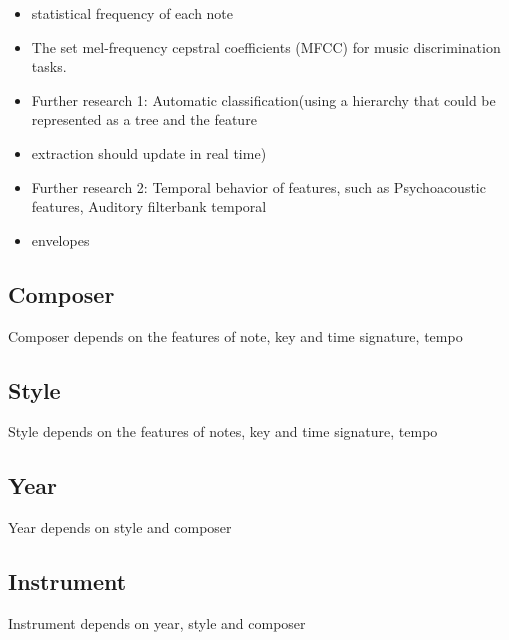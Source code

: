 \documentclass[a4paper,12pt]{article}
\begin{document}
\begin{itemize}
    \item statistical frequency of each note 
    \item The set mel-frequency cepstral coefficients (MFCC) for music discrimination tasks.
    \item Further research 1: Automatic classification(using a hierarchy that could be represented as a tree and the feature
    \item extraction should update in real time)
    \item Further research 2: Temporal behavior of features, such as Psychoacoustic features, Auditory filterbank temporal       
    \item envelopes
\end{itemize}

\subsection{Composer}

Composer depends on the features of note, key and time signature, tempo

\subsection{Style}

Style depends on the features of notes, key and time signature, tempo

\subsection{Year}

Year depends on style and composer

\subsection{Instrument}

Instrument depends on year, style and composer


\end{document}
